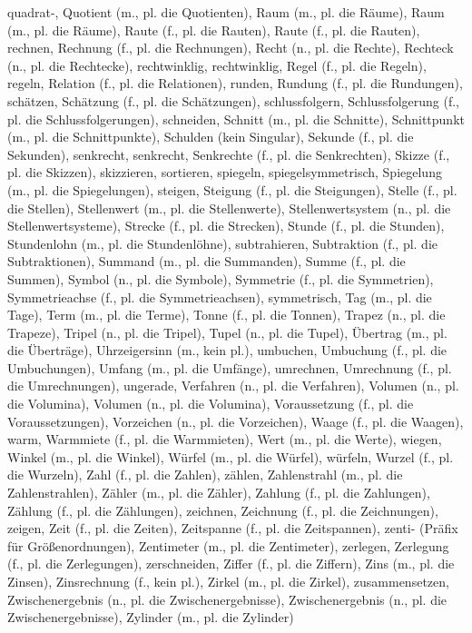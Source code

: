 quadrat-,
Quotient (m., pl. die Quotienten),
Raum (m., pl. die Räume),
Raum (m., pl. die Räume),
Raute (f., pl. die Rauten),
Raute (f., pl. die Rauten),
rechnen,
Rechnung (f., pl. die Rechnungen),
Recht (n., pl. die Rechte),
Rechteck (n., pl. die Rechtecke),
rechtwinklig,
rechtwinklig,
Regel (f., pl. die Regeln),
regeln,
Relation (f., pl. die Relationen),
runden,
Rundung (f., pl. die Rundungen),
schätzen,
Schätzung (f., pl. die Schätzungen),
schlussfolgern,
Schlussfolgerung (f., pl. die Schlussfolgerungen),
schneiden,
Schnitt (m., pl. die Schnitte),
Schnittpunkt (m., pl. die Schnittpunkte),
Schulden (kein Singular),
Sekunde (f., pl. die Sekunden),
senkrecht,
senkrecht,
Senkrechte (f., pl. die Senkrechten),
Skizze (f., pl. die Skizzen),
skizzieren,
sortieren,
spiegeln,
spiegelsymmetrisch,
Spiegelung (m., pl. die Spiegelungen),
steigen,
Steigung (f., pl. die Steigungen),
Stelle (f., pl. die Stellen),
Stellenwert (m., pl. die Stellenwerte),
Stellenwertsystem (n., pl. die Stellenwertsysteme),
Strecke (f., pl. die Strecken),
Stunde (f., pl. die Stunden),
Stundenlohn (m., pl. die Stundenlöhne),
subtrahieren,
Subtraktion (f., pl. die Subtraktionen),
Summand (m., pl. die Summanden),
Summe (f., pl. die Summen),
Symbol (n., pl. die Symbole),
Symmetrie (f., pl. die Symmetrien),
Symmetrieachse (f., pl. die Symmetrieachsen),
symmetrisch,
Tag (m., pl. die Tage),
Term (m., pl. die Terme),
Tonne (f., pl. die Tonnen),
Trapez (n., pl. die Trapeze),
Tripel (n., pl. die Tripel),
Tupel (n., pl. die Tupel),
Übertrag (m., pl. die Überträge),
Uhrzeigersinn (m., kein pl.),
umbuchen,
Umbuchung (f., pl. die Umbuchungen),
Umfang (m., pl. die Umfänge),
umrechnen,
Umrechnung (f., pl. die Umrechnungen),
ungerade,
Verfahren (n., pl. die Verfahren),
Volumen (n., pl. die Volumina),
Volumen (n., pl. die Volumina),
Voraussetzung (f., pl. die Voraussetzungen),
Vorzeichen (n., pl. die Vorzeichen),
Waage (f., pl. die Waagen),
warm,
Warmmiete (f., pl. die Warmmieten),
Wert (m., pl. die Werte),
wiegen,
Winkel (m., pl. die Winkel),
Würfel (m., pl. die Würfel),
würfeln,
Wurzel (f., pl. die Wurzeln),
Zahl (f., pl. die Zahlen),
zählen,
Zahlenstrahl (m., pl. die Zahlenstrahlen),
Zähler (m., pl. die Zähler),
Zahlung (f., pl. die Zahlungen),
Zählung (f., pl. die Zählungen),
zeichnen,
Zeichnung (f., pl. die Zeichnungen),
zeigen,
Zeit (f., pl. die Zeiten),
Zeitspanne (f., pl. die Zeitspannen),
zenti- (Präfix für Größenordnungen),
Zentimeter (m., pl. die Zentimeter),
zerlegen,
Zerlegung (f., pl. die Zerlegungen),
zerschneiden,
Ziffer (f., pl. die Ziffern),
Zins (m., pl. die Zinsen),
Zinsrechnung (f., kein pl.),
Zirkel (m., pl. die Zirkel),
zusammensetzen,
Zwischenergebnis (n., pl. die Zwischenergebnisse),
Zwischenergebnis (n., pl. die Zwischenergebnisse),
Zylinder (m., pl. die Zylinder) 